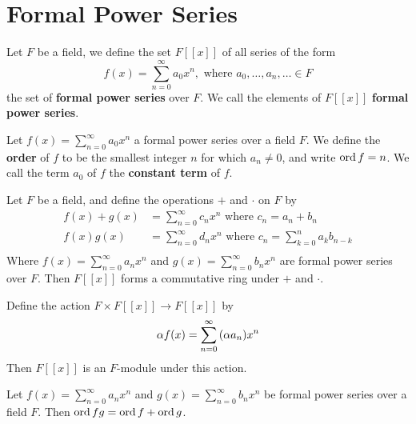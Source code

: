\section{Formal Power Series}

\begin{definition}
    Let $F$ be a field, we define the set  $F[[x]]$ of all series of the form
    \begin{equation*}
        f(x)=\sum_{n=0}^\infty{a_0x^n}, \text{ where } a_0, \dots, a_n ,\dots \in F
    \end{equation*}
    the set of \textbf{formal power series} over $F$. We call the elements of
    $F[[x]]$ \textbf{formal power series}.
\end{definition}

\begin{definition}
    Let $f(x)=\sum_{n=0}^\infty{a_0x^n}$ a formal power series over a field $F$.
    We define the  \textbf{order} of $f$ to be the smallest integer  $n$ for
    which $a_n \neq 0$, and write  $\operatorname{ord}{f}=n$. We call the term $a_0$ of $f$
    the  \textbf{constant term} of $f$.
\end{definition}

\begin{lemma}\label{2.1.1}
    Let $F$ be a field, and define the operations $+$ and $\cdot$ on  $F$ by
    \begin{align*}
        f(x)+g(x) &= \sum_{n=0}^\infty{c_nx^n} \text{ where }c_n=a_n+b_n   \\
        f(x)g(x) &= \sum_{n=0}^\infty{d_nx^n}
                    \text{ where }c_n=\sum_{k=0}^n{a_kb_{n-k}}   \\
    \end{align*}
    Where $f(x)=\sum_{n=0}^\infty{a_nx^n}$ and $g(x)=\sum_{n=0}^\infty{b_nx^n}$
    are formal power series over $F$. Then  $F[[x]]$ forms a commutative ring
    under $+$ and  $\cdot$.
\end{lemma}
\begin{corollary}
    Define the action $F \times  F[[x]] \xrightarrow{} F[[x]]$ by
    \begin{equation*}
        \alpha f(x)=\sum_{n=0}^\infty{(\alpha a_n)x^n}
    \end{equation*}
    Then $F[[x]]$ is an $F$-module under this action.
\end{corollary}

\begin{lemma}\label{2.1.2}
    Let $f(x)=\sum_{n=0}^\infty{a_nx^n}$ and $g(x)=\sum_{n=0}^\infty{b_nx^n}$ be
    formal power series over a field $F$. Then  $\operatorname{ord}{fg}=\operatorname{ord}{f}+\operatorname{ord}{g}$.
\end{lemma}

